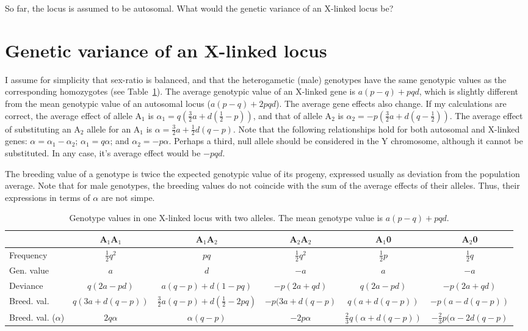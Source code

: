 \documentclass[a4paper,12pt]{article}
\begin{document}
So far, the locus is assumed to be autosomal. What would the genetic variance of an X-linked locus be?

\section{Genetic variance of an X-linked locus}
I assume for simplicity that sex-ratio is balanced, and that the heterogametic (male) genotypes have the same genotypic values as the corresponding homozygotes (see Table~\ref{tau:xlinked}). The average genotypic value of an X-linked gene is $a(p-q)+pqd$, which is slightly different from the mean genotypic value of an autosomal locus ($a(p-q)+2pqd$). The average gene effects also change. If my calculations are correct, the average effect of allele A$_1$ is $\alpha{}_1 = q(\frac{3}{2}a + d(\frac{1}{2}-p))$, and that of allele A$_2$ is $\alpha{}_2 = -p(\frac{3}{2}a + d(q-\frac{1}{2}))$. The average effect of substituting an A$_2$ allele for an A$_1$ is $\alpha = \frac{3}{2}a + \frac{1}{2}d(q-p)$. Note that the following relationships hold for both autosomal and X-linked genes: $\alpha = \alpha{}_1 - \alpha{}_2$; $\alpha{}_1 = q\alpha$; and $\alpha{}_2 = -p\alpha$. Perhaps a third, null allele should be considered in the Y chromosome, although it cannot be substituted. In any case, it's average effect would be $-pqd$.

The breeding value of a genotype is twice the expected genotypic value of its progeny, expressed usually as deviation from the population average. Note that for male genotypes, the breeding values do not coincide with the sum of the average effects of their alleles. Thus, their expressions in terms of $\alpha$ are not simpe.

\begin{table}
\begin{center}
\caption{Genotype values in one X-linked locus with two alleles. The mean genotype value is $a(p-q)+pqd$.}\label{tau:xlinked}
\vspace*{0.3cm}
{\footnotesize
\begin{tabular}{p{2.4cm}ccccc}
\toprule
&A$_1$A$_1$&A$_1$A$_2$&A$_2$A$_2$&A$_1$0&A$_2$0\\
\midrule
Frequency&$\frac{1}{2}q^2$&$pq$&$\frac{1}{2}q^2$&$\frac{1}{2}p$&$\frac{1}{2}q$\\
Gen. value&$a$&$d$&$-a$&$a$&$-a$\\
Deviance&$q(2a-pd)$&$a(q-p)+d(1-pq)$&$-p(2a+qd)$&$q(2a-pd)$&$-p(2a+qd)$\\
Breed. val.&$q(3a+d(q-p))$&$\frac{3}{2}a(q-p)+d(\frac{1}{2}-2pq)$&$-p(3a+d(q-p)$&$q(a+d(q-p))$&$-p(a-d(q-p))$\\
Breed. val. ($\alpha$)&$2q\alpha$&$\alpha(q-p)$&$-2p\alpha$&$\frac{2}{3}q(\alpha + d(q-p))$&$-\frac{2}{3}p(\alpha -2d(q-p)$\\
\bottomrule
\end{tabular}
}
\end{center}
\end{table}
\end{document}
